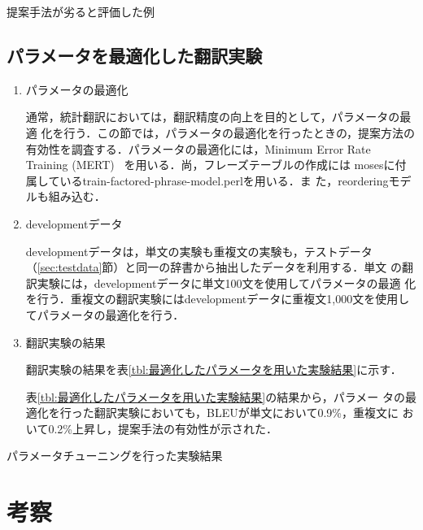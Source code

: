 \documentclass[japanese]{jnlp_1.4}
\begin{document}
\begin{table}[t]
\caption{提案手法が劣ると評価した例}
\label{tb11:対比較実験の結果 提案手法が劣ると評価した例（日英翻訳の単文）}

\end{table}



\subsection{パラメータを最適化した翻訳実験}

\begin{enumerate}

\item{パラメータの最適化}

通常，統計翻訳においては，翻訳精度の向上を目的として，パラメータの最適
化を行う．この節では，パラメータの最適化を行ったときの，提案方法の
有効性を調査する．パラメータの最適化には，Minimum Error Rate
Training (MERT)~\cite{mert} を用いる．尚，フレーズテーブルの作成には
mosesに付属しているtrain-factored-phrase-model.perlを用いる．ま
た，reorderingモデルも組み込む．

\item{developmentデータ}

developmentデータは，単文の実験も重複文の実験も，テストデータ
（\ref{sec:testdata}節）と同一の辞書から抽出したデータを利用する．単文
の翻訳実験には，developmentデータに単文100文を使用してパラメータの最適
化を行う．重複文の翻訳実験にはdevelopmentデータに重複文1,000文を使用し
てパラメータの最適化を行う．


\item{翻訳実験の結果}

翻訳実験の結果を表\ref{tbl:最適化したパラメータを用いた実験結果}に示す．



表{\ref{tbl:最適化したパラメータを用いた実験結果}}の結果から，パラメー
タの最適化を行った翻訳実験においても，BLEUが単文において0.9\%，重複文に
おいて0.2\%上昇し，提案手法の有効性が示された．

\end{enumerate}

\begin{table}[t]
\caption{パラメータチューニングを行った実験結果}
\label{tbl:最適化したパラメータを用いた実験結果}

\end{table}




\section{考察}
\end{document}
